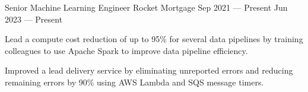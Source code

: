 
\vspace{-0.1cm}
\begin{cventries}
  \cventry
    {Senior Machine Learning Engineer} %
    {Rocket Mortgage} %
    {Sep 2021 --- Present} %
    {Jun 2023 --- Present} %
    {
      \vspace{-0.1cm}
      \begin{cvitems} %
        \item Lead a compute cost reduction of up to 95\% for several data pipelines by training colleagues to use Apache Spark to improve data pipeline efficiency.
        \item Improved a lead delivery service by eliminating unreported errors and reducing remaining errors by 90\% using AWS Lambda and SQS message timers.
      \end{cvitems}
    }
  \vspace{-.2cm}


\end{cventries}
